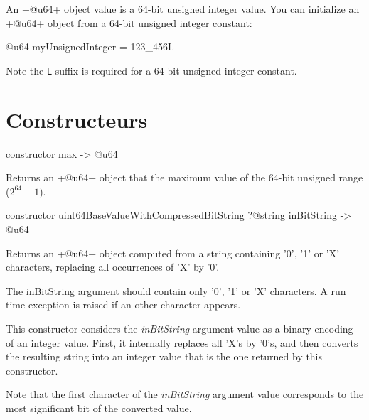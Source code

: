 


An \ggsq+@u64+ object value is a 64-bit unsigned integer value. You can initialize an \ggsq+@u64+ object from a 64-bit unsigned integer constant:

\begin{galgas4}
@u64 myUnsignedInteger = 123_456L
\end{galgas4}

Note the \texttt{L} suffix is required for a 64-bit unsigned integer constant.

\section{Constructeurs}





\begin{galgas4}
constructor max -> @u64
\end{galgas4}

Returns an \ggsq+@u64+ object that the maximum value of the 64-bit unsigned range ($2^{64}-1$).



\begin{galgas4}
constructor uint64BaseValueWithCompressedBitString
   ?@string inBitString
   -> @u64
\end{galgas4}


Returns an \ggsq+@u64+ object computed from a string containing '0', '1' or 'X' characters, replacing all occurrences of 'X' by '0'.

The inBitString argument should contain only '0', '1' or 'X' characters. A run time exception is raised if an other character appears.

This constructor considers the \emph{inBitString} argument value as a binary encoding of an integer value. First, it internally replaces all 'X's by '0's, and then converts the resulting string into an integer value that is the one returned by this constructor.

Note that the first character of the \emph{inBitString} argument value corresponds to the most significant bit of the converted value.


